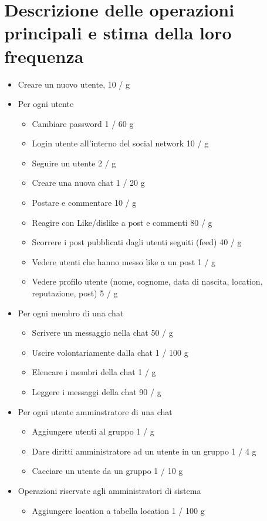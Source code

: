 \documentclass[a4paper,12pt]{report}
\begin{document}
\section{Descrizione delle operazioni principali e stima della loro frequenza}
\begin{itemize}
  \item Creare un nuovo utente, 10 / g
  \item {
    Per ogni utente
    \begin{itemize}
      \item Cambiare password 1 / 60 g
      \item Login utente all'interno del social network 10 / g
      \item Seguire un utente 2 / g
      \item Creare una nuova chat 1 / 20 g
      \item Postare e commentare 10 / g
      \item Reagire con Like/dislike a post e commenti 80 / g
      \item Scorrere i post pubblicati dagli utenti seguiti (feed) 40 / g
      \item Vedere utenti che hanno messo like a un post 1 / g
      \item Vedere profilo utente (nome, cognome, data di nascita, location, reputazione, post) 5 / g
    \end{itemize} 
  }
  \item {
      Per ogni membro di una chat
      \begin{itemize}
        \item Scrivere un messaggio nella chat 50 / g
        \item Uscire volontariamente dalla chat 1 / 100 g
        \item Elencare i membri della chat 1 / g
        \item Leggere i messaggi della chat 90 / g
      \end{itemize}
    }
  \item {
      Per ogni utente amminstratore di una chat 
      \begin{itemize}
        \item Aggiungere utenti al gruppo 1 / g
        \item Dare diritti amministratore ad un utente in un gruppo 1 / 4 g
        \item Cacciare un utente da un gruppo 1 / 10 g
      \end{itemize}
    }
  \item {
      Operazioni riservate agli amministratori di sistema
      \begin{itemize}
        \item Aggiungere location a tabella location 1 / 100 g
      \end{itemize} 
    }
 
\end{itemize}
\end{document}
